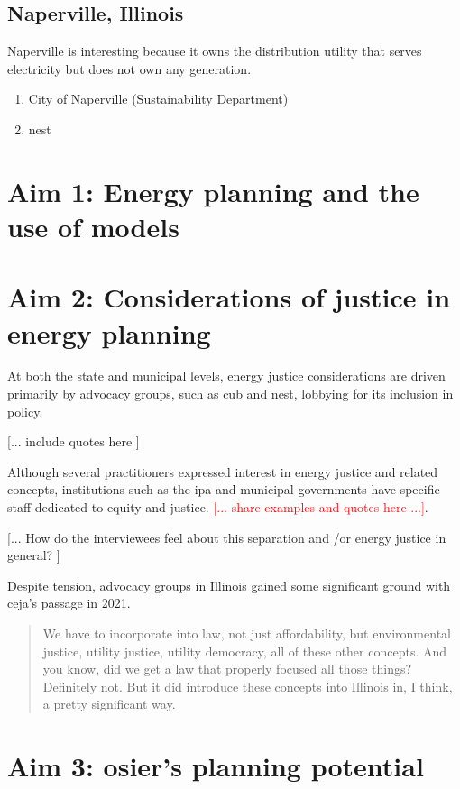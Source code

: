 \subsection{Naperville, Illinois}
Naperville is interesting because it owns the distribution utility that serves
electricity but does not own any generation.
\begin{enumerate}
    \item City of Naperville (Sustainability Department)
    \item \ac{nest}
\end{enumerate}



\section{Aim 1: Energy planning and the use of models}


\section{Aim 2: Considerations of justice in energy planning}

At both the state and municipal levels, energy justice considerations are driven
primarily by advocacy groups, such as \ac{cub} and \ac{nest}, lobbying for its
inclusion in policy. 

[... include quotes here ]

Although several practitioners expressed interest in energy justice and related
concepts, institutions such as the \ac{ipa} and municipal governments have
specific staff dedicated to equity and justice. \textcolor{red}{[... share
examples and quotes here ...]}. 

[... How do the interviewees feel about this separation and /or energy justice
in general? ]

Despite tension, advocacy groups in Illinois gained some significant ground with
\ac{ceja}'s passage in 2021. 

\begin{quotation}
    We have to incorporate into law, not just affordability, but environmental
    justice, utility justice, utility democracy, all of these other concepts.
    And you know, did we get a law that properly focused all those things?
    Definitely not. But it did introduce these concepts into Illinois in, I
    think, a pretty significant way.
\end{quotation}

\section{Aim 3: \ac{osier}'s planning potential}

